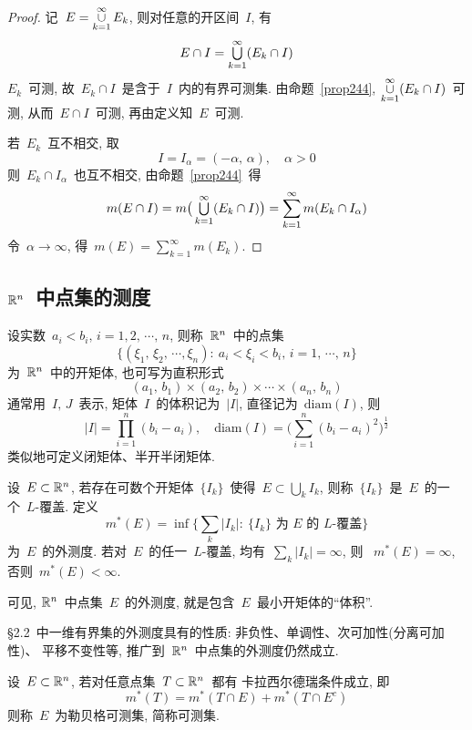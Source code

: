\begin{proof}
记~$E = \mathop{\cup}\limits_{k=1}^\infty E_k$, 则对任意的开区间~$I$, 有
\[
E \cap I = \mathop{\textstyle{\bigcup}}_{k=1}^\infty (E_k \cap I)
\]
$E_k$~可测, 故~$E_k \cap I$~是含于~$I$~内的有界可测集. 由命题~\ref{prop244},
$\mathop{\cup}\limits_{k=1}^\infty (E_k \cap I)$~可测, 从而~$E \cap I$~可测, 再由定义知~$E$~可测.

若~$E_k$~互不相交, 取
\[
I = I_\alpha = (-\alpha,\,\alpha), \quad \alpha > 0
\]
则~$E_k \cap I_\alpha$~也互不相交, 由命题~\ref{prop244}~得
\[
m(E \cap I) = m \big(\mathop{\textstyle{\bigcup}}_{k=1}^\infty (E_k \cap I)\big) = \sum_{k=1}^\infty
m(E_k \cap I_\alpha)
\]
令~$\alpha \to \infty$, 得~$m(E) = \sum\limits_{k=1}^\infty m(E_k)$.
\end{proof}

\subsection{$\mathbb{R}^n$~中点集的测度}

\begin{definition}
设实数~$a_i < b_i,\,i=1,2,\,\cdots,\,n$, 则称~$\mathbb{R}^n$~中的点集
\[
\big\{(\xi_1,\,\xi_2,\,\cdots,\xi_n):\: a_i < \xi_i < b_i,\,i=1,\,\cdots,\,n\big\}
\]
为~$\mathbb{R}^n$~中的开矩体, 也可写为直积形式
\[
(a_1,\,b_1) \times (a_2,\,b_2) \times \cdots \times (a_n,\,b_n)
\]
通常用~$I,\,J$~表示, 矩体~$I$~的体积记为~$|I|$, 直径记为~$\mathrm{diam}(I)$, 则
\[
|I| = \mathop{\textstyle{\prod}}\limits_{i=1}^n(b_i - a_i), \quad \mathrm{diam}(I) = \Big(\mathop{\textstyle{\sum}}\limits_{i=1}^n (b_i - a_i)^2
\Big)^\frac{1}{2}
\]
类似地可定义闭矩体、半开半闭矩体.
\end{definition}

\begin{definition}
设~$E \subset \mathbb{R}^n$, 若存在可数个开矩体~$\{I_k\}$~使得~$E \subset \bigcup
\limits_k I_k$, 则称~$\{I_k\}$~是~$E$~的一个~$L$-覆盖. 定义
\[
m^*(E) = \inf \Big\{ \mathop{\textstyle{\sum}}\limits_k |I_k|: \: \{I_k\} \mbox{~为~$E$~的~$L$-覆盖} \Big\}
\]
为~$E$~的外测度. 若对~$E$~的任一~$L$-覆盖, 均有~$\sum\limits_k |I_k| = \infty$, 则
~$m^*(E) = \infty$, 否则~$m^*(E) < \infty$.
\end{definition}

可见, $\mathbb{R}^n$~中点集~$E$~的外测度, 就是包含~$E$~最小开矩体的``体积''.

\S2.2~中一维有界集的外测度具有的性质: 非负性、单调性、次可加性(分离可加性)、
平移不变性等, 推广到~$\mathbb{R}^n$~中点集的外测度仍然成立.

\begin{definition}
设~$E \subset \mathbb{R}^n$, 若对任意点集~$T \subset \mathbb{R}^n$~都有
卡拉西尔德瑞条件成立, 即
\[
m^*(T) = m^*(T \cap E) + m^*(T \cap E^c)
\]
则称~$E$~为勒贝格可测集, 简称可测集.
\end{definition}

